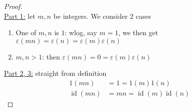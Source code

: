 \documentclass{article}
\theoremstyle{definition}
\begin{document}
\begin{proof} \ \\
\underline{Part 1:} let $m, n$ be integers. We consider 2 cases
\begin{enumerate}
	\item One of $m, n$ is $1$: wlog, say $m = 1$, we then get $\varepsilon(mn) = \varepsilon(n) = \varepsilon(m) \varepsilon(n)$
	\item $m, n > 1$: then $\varepsilon(mn) = 0 = \varepsilon(m) \varepsilon(n)$
\end{enumerate}
\underline{Part 2, 3:} straight from definition
\begin{align*}
1(mn) & = 1 = 1(m) 1(n) \\
\operatorname{id} (mn) & = mn = \operatorname{id} (m) \operatorname{id} (n)
\end{align*}
\end{proof}
\end{document}
